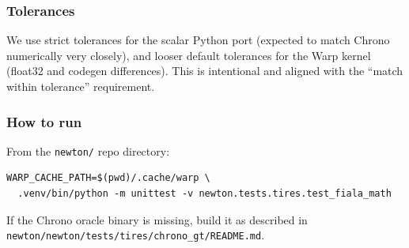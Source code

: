 \subsubsection{Tolerances}
We use strict tolerances for the scalar Python port (expected to match Chrono numerically very closely),
and looser default tolerances for the Warp kernel (float32 and codegen differences).
This is intentional and aligned with the ``match within tolerance'' requirement.

\subsubsection{How to run}
From the \texttt{newton/} repo directory:
\begin{verbatim}
WARP_CACHE_PATH=$(pwd)/.cache/warp \
  .venv/bin/python -m unittest -v newton.tests.tires.test_fiala_math
\end{verbatim}
\noindent
If the Chrono oracle binary is missing, build it as described in \texttt{newton/newton/tests/tires/chrono\_gt/README.md}.

